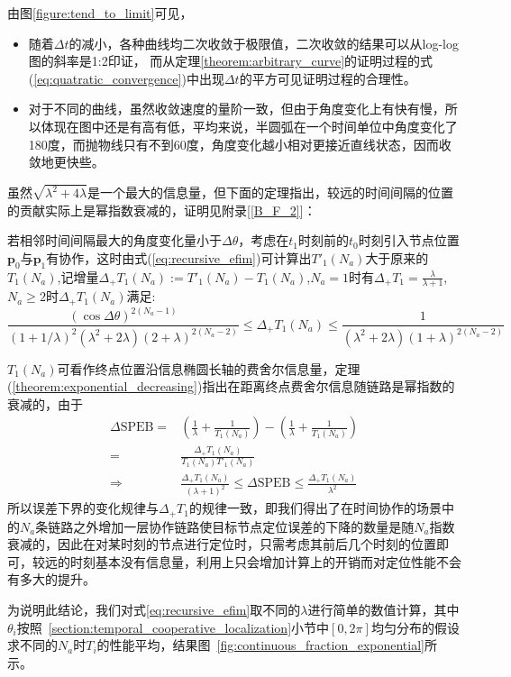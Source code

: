 由图\ref{figure:tend_to_limit}可见，
\begin{itemize}
  \item 随着$\Delta t$的减小，各种曲线均二次收敛于极限值，二次收敛的结果可以从log-log图的斜率是1:2印证，
而从定理\ref{theorem:arbitrary_curve}的证明过程的式(\ref{eq:quatratic_convergence})中出现$\Delta t$的平方可见证明过程的合理性。
  \item 对于不同的曲线，虽然收敛速度的量阶一致，但由于角度变化上有快有慢，所以体现在图中还是有高有低，平均来说，半圆弧在一个时间单位中角度变化了180度，而抛物线只有不到60度，角度变化越小相对更接近直线状态，因而收敛地更快些。
\end{itemize}
虽然$\sqrt{\lambda^2+4\lambda}$是一个最大的信息量，但下面的定理指出，较远的时间间隔的位置的贡献实际上是幂指数衰减的，证明见附录[\ref{B_F_2}]：
\begin{theorem}\label{theorem:exponential_decreasing}
若相邻时间间隔最大的角度变化量小于$\Delta \theta$，考虑在$t_1$时刻前的$t_0$时刻引入节点位置$\bm{p}_0$与$\bm{p}_1$有协作，这时由式(\ref{eq:recursive_efim})可计算出$T'_1(N_a)$大于原来的$T_1(N_a)$,记增量$\Delta_+ T_1(N_a):=T'_1(N_a)-T_1(N_a)$,$N_a=1$时有$\Delta_{+} T_{1}=\frac{\lambda}{\lambda+1}$,$N_a\geq 2$时$\Delta_+ T_1(N_a)$满足:
\[
\frac{(\cos\Delta\theta)^{2(N_a-1)}}{(1+1/\lambda)^2(\lambda^2+2\lambda)(2+\lambda)^{2(N_a-2)}}\leq \Delta_+ T_1(N_a)\leq\frac{1}{(\lambda^2+2\lambda)(1+\lambda)^{2(N_a-2)}}
\]
\end{theorem}
\begin{remark}
$T_1(N_a)$可看作终点位置沿信息椭圆长轴的费舍尔信息量，定理(\ref{theorem:exponential_decreasing})指出在距离终点费舍尔信息随链路是幂指数的衰减的，由于
\begin{align*}
  \Delta \text{SPEB}=&(\frac{1}{\lambda}+\frac{1}{T_1(N_a)})-(\frac{1}{\lambda}+\frac{1}{T_1(N_a)})\\
  =&\frac{\Delta_+ T_1(N_a)}{T_1(N_a)T'_1(N_a)}\\
  \Longrightarrow &\frac{\Delta_+ T_1(N_a)}{(\lambda+1)^2}\leq  \Delta \text{SPEB} \leq \frac{\Delta_+ T_1(N_a)}{\lambda^2}
\end{align*}
所以误差下界的变化规律与$\Delta_{+} T_{1}$的规律一致，即我们得出了在时间协作的场景中的$N_a$条链路之外增加一层协作链路使目标节点定位误差的下降的数量是随$N_a$指数衰减的，因此在对某时刻的节点进行定位时，只需考虑其前后几个时刻的位置即可，较远的时刻基本没有信息量，利用上只会增加计算上的开销而对定位性能不会有多大的提升。
\end{remark}
为说明此结论，我们对式\ref{eq:recursive_efim}取不同的$\lambda$进行简单的数值计算，其中$\theta_i$按照~\ref{section:temporal_cooperative_localization}小节中$[0,2\pi]$均匀分布的假设求不同的$N_a$时$T_i$的性能平均，结果图~\ref{fig:continuous_fraction_exponential}所示。
